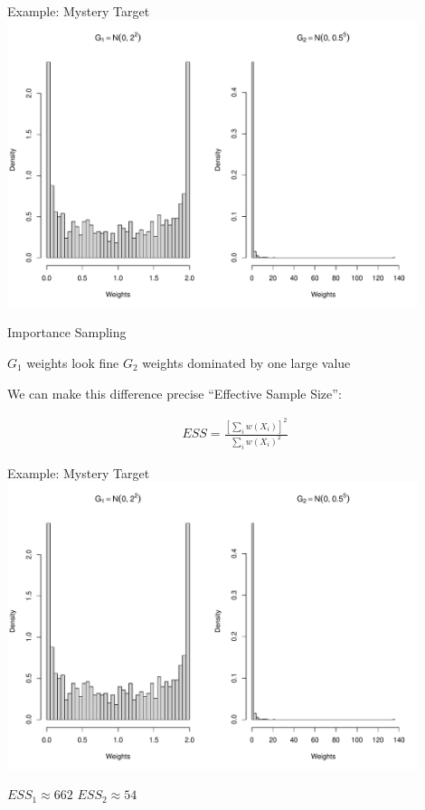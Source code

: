 \documentclass[14pt]{beamer}
\begin{document}
\begin{frame}{Example: Mystery Target}
    \centering
    \includegraphics[height=0.9\textheight, width=0.9\textwidth, keepaspectratio]{Figures/Wt Hist.pdf}
\end{frame}

\begin{frame}{Importance Sampling}
    \begin{outline}
        \1 $G_1$ weights look fine
        \1 $G_2$ weights dominated by one large value \newline

        \1 We can make this difference precise
        \1 ``Effective Sample Size'':
    \end{outline}
    \begin{gather*}
        ESS = \frac{\left[\sum_i w(X_i)\right]^2}{\sum_i w(X_i)^2}
    \end{gather*}
\end{frame}

\begin{frame}{Example: Mystery Target}
    \centering
    \includegraphics[height=0.7\textheight, width=0.9\textwidth, keepaspectratio]{Figures/Wt Hist.pdf} \newline
    \begin{outline}
        $ESS_1 \approx 662$ \hspace{2.5cm} $ESS_2 \approx 54$
    \end{outline}
\end{frame}
\end{document}
